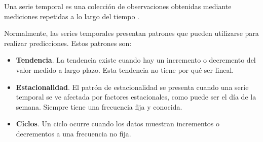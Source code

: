 Una serie temporal es una colección de observaciones obtenidas mediante mediciones repetidas a lo largo del tiempo \cite{hamilton2020time}.

Normalmente, las series temporales presentan patrones que pueden utilizarse para realizar predicciones. Estos patrones son:
\begin{itemize}
    \item \textbf{Tendencia}. La tendencia existe cuando hay un incremento o decremento del valor medido a largo plazo. Esta tendencia
        no tiene por qué ser lineal.
    \item \textbf{Estacionalidad}. El patrón de estacionalidad se presenta cuando una serie temporal se ve afectada por factores estacionales,
        como puede ser el día de la semana. Siempre tiene una frecuencia fija y conocida.
    \item \textbf{Ciclos}. Un ciclo ocurre cuando los datos muestran incrementos o decrementos a una frecuencia no fija.
\end{itemize}


